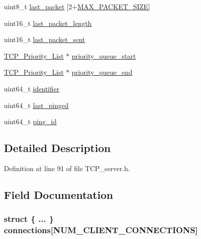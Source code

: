 \begin{DoxyCompactItemize}
\begin{tabbing}
\end{tabbing}\item 
uint8\+\_\+t \hyperlink{struct_t_c_p___secure___connection_af7b6d103d243e4267b112f6efe1573e2}{last\+\_\+packet} \mbox{[}2+\hyperlink{_t_c_p__server_8h_a879456c3b8e2853f7044d764e9c180d4}{M\+A\+X\+\_\+\+P\+A\+C\+K\+E\+T\+\_\+\+S\+I\+Z\+E}\mbox{]}
\item 
uint16\+\_\+t \hyperlink{struct_t_c_p___secure___connection_a78d503fe4c8d935701480b58a0461775}{last\+\_\+packet\+\_\+length}
\item 
uint16\+\_\+t \hyperlink{struct_t_c_p___secure___connection_a80b55fa7d5b8e4c3de6b51c99d7670cc}{last\+\_\+packet\+\_\+sent}
\item 
\hyperlink{struct_t_c_p___priority___list}{T\+C\+P\+\_\+\+Priority\+\_\+\+List} $\ast$ \hyperlink{struct_t_c_p___secure___connection_a5e19017835c72dc03d9dfd9a93abeb3c}{priority\+\_\+queue\+\_\+start}
\item 
\hyperlink{struct_t_c_p___priority___list}{T\+C\+P\+\_\+\+Priority\+\_\+\+List} $\ast$ \hyperlink{struct_t_c_p___secure___connection_a049dfdaebf54337c3024e077370c62d7}{priority\+\_\+queue\+\_\+end}
\item 
uint64\+\_\+t \hyperlink{struct_t_c_p___secure___connection_ad1813f451cfaf8c9700e6329c5ea2f2b}{identifier}
\item 
uint64\+\_\+t \hyperlink{struct_t_c_p___secure___connection_a4049204f6c392628d31be6c39f03e031}{last\+\_\+pinged}
\item 
uint64\+\_\+t \hyperlink{struct_t_c_p___secure___connection_acec02fbdff648ca71a6d8e5a0d63d634}{ping\+\_\+id}
\end{DoxyCompactItemize}


\subsection{Detailed Description}


Definition at line 91 of file T\+C\+P\+\_\+server.\+h.



\subsection{Field Documentation}
\hypertarget{struct_t_c_p___secure___connection_a9238a77824a37f8db533e2fbbf79c4a1}{
\subsubsection[{connections}]{\setlength{\rightskip}{0pt plus 5cm}struct \{ ... \}   connections\mbox{[}{\bf N\+U\+M\+\_\+\+C\+L\+I\+E\+N\+T\+\_\+\+C\+O\+N\+N\+E\+C\+T\+I\+O\+N\+S}\mbox{]}}}\label{struct_t_c_p___secure___connection_a9238a77824a37f8db533e2fbbf79c4a1}


